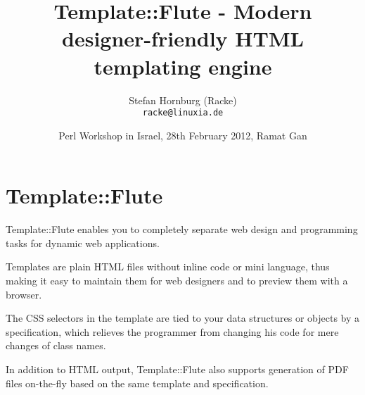 
\usepackage[T1]{fontenc}
\usepackage{mathptmx}
\usepackage[scaled=.90]{helvet}
\usepackage{courier}

\usepackage{beamerthemesplit}
\usepackage{verbatim}
\usepackage{hyperref}
\usepackage{listings}
\lstset{language=Perl,basicstyle=\footnotesize,tabsize=3,showstringspaces=false}

\title{Template::Flute - Modern designer-friendly HTML templating engine}
\author[racke]{Stefan Hornburg (Racke)\\ \texttt{racke@linuxia.de}}
\date[]{Perl Workshop in Israel, 28th February 2012, Ramat Gan}


\maketitle{}

\begin{frame}
  \titlepage
\end{frame}

\tableofcontents

\section{Template::Flute}
Template::Flute enables you to completely separate web design and programming
tasks for dynamic web applications. 

Templates are plain HTML files without inline code or mini language, thus
making it easy to maintain them for web designers and to preview them with
a browser.

The CSS selectors in the template are tied to your data structures or
objects by a specification, which relieves the programmer from changing
his code for mere changes of class names.

In addition to HTML output, Template::Flute also supports generation of
PDF files on-the-fly based on the same template and specification.

